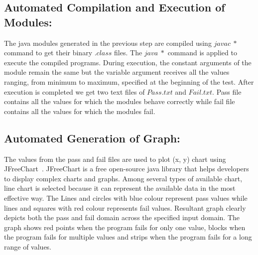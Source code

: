 \subsection{Automated Compilation and Execution of Modules:}
The java modules generated in the previous step are compiled using $javac~*$ command to get their binary $.class$ files. The $java~*$ command is applied to execute the compiled programs. During execution, the constant arguments of the module remain the same but the variable argument receives all the values ranging, from minimum to maximum, specified at the beginning of the test. After execution is completed we get two text files of $Pass.txt$ and $Fail.txt$. Pass file contains all the values for which the modules behave correctly while fail file contains all the values for which the modules fail.

\subsection{Automated Generation of Graph:}
The values from the pass and fail files are used to plot (x, y) chart using JFreeChart~\cite{gilbert2008jfreechart}. JFreeChart is a free open-source java library that helps developers to display complex charts and graphs. Among several types of available chart, line chart is selected because it can represent the available data in the most effective way. The Lines and circles with blue colour represent pass values while lines and squares with red colour represents fail values. Resultant graph clearly depicts both the pass and fail domain across the specified input domain. The graph shows red points when the program fails for only one value, blocks when the program fails for multiple values and strips when the program fails for a long range of values.%








